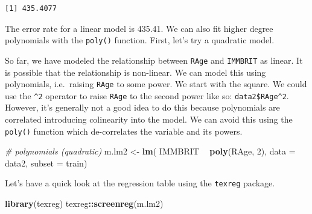 \documentclass[]{article}
\newenvironment{Shaded}{\begin{snugshade}}{\end{snugshade}}
\newcommand{\CommentTok}[1]{\textcolor[rgb]{0.56,0.35,0.01}{\textit{#1}}}
\newcommand{\DataTypeTok}[1]{\textcolor[rgb]{0.13,0.29,0.53}{#1}}
\newcommand{\DecValTok}[1]{\textcolor[rgb]{0.00,0.00,0.81}{#1}}
\newcommand{\KeywordTok}[1]{\textcolor[rgb]{0.13,0.29,0.53}{\textbf{#1}}}
\newcommand{\NormalTok}[1]{#1}
\newcommand{\OperatorTok}[1]{\textcolor[rgb]{0.81,0.36,0.00}{\textbf{#1}}}
\newcommand{\StringTok}[1]{\textcolor[rgb]{0.31,0.60,0.02}{#1}}
\begin{document}
\begin{Shaded}
\end{Shaded}

\begin{verbatim}
[1] 435.4077
\end{verbatim}

The error rate for a linear model is 435.41. We can also fit higher degree polynomials with the \texttt{poly()} function. First, let's try a quadratic model.

So far, we have modeled the relationship between \texttt{RAge} and \texttt{IMMBRIT} as linear. It is possible that the relationship is non-linear. We can model this using polynomials, i.e.~raising \texttt{RAge} to some power. We start with the square. We could use the \texttt{\^{}2} operator to raise \texttt{RAge} to the second power like so: \texttt{data2\$RAge\^{}2}. However, it's generally not a good idea to do this because polynomials are correlated introducing colinearity into the model. We can avoid this using the \texttt{poly()} function which de-correlates the variable and its powers.

\begin{Shaded}
\begin{Highlighting}[]
\CommentTok{# polynomials (quadratic)}
\NormalTok{m.lm2 <-}\StringTok{ }\KeywordTok{lm}\NormalTok{( IMMBRIT }\OperatorTok{~}\StringTok{ }\KeywordTok{poly}\NormalTok{(RAge, }\DecValTok{2}\NormalTok{), }\DataTypeTok{data =}\NormalTok{ data2, }\DataTypeTok{subset =}\NormalTok{ train)}
\end{Highlighting}
\end{Shaded}

Let's have a quick look at the regression table using the \texttt{texreg} package.

\begin{Shaded}
\begin{Highlighting}[]
\KeywordTok{library}\NormalTok{(texreg)}
\NormalTok{texreg}\OperatorTok{::}\KeywordTok{screenreg}\NormalTok{(m.lm2)}
\end{Highlighting}
\end{Shaded}
\end{document}
